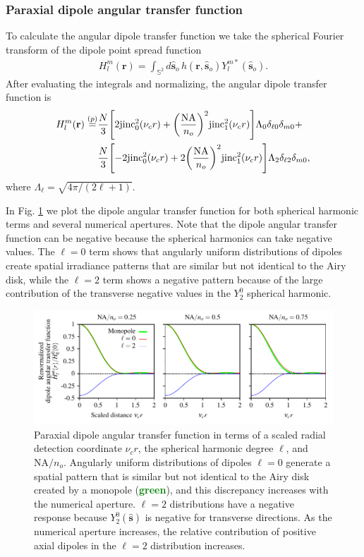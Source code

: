 \documentclass[]{osa-article}
\let\originalleft\left
\let\originalright\right
\renewcommand{\left}{\mathopen{}\mathclose\bgroup\originalleft}
\renewcommand{\right}{\aftergroup\egroup\originalright}
\providecommand{\mb}[1]{\mathbf{#1}}
\providecommand{\so}{\mathbf{\hat{s}}_o}
\providecommand{\mh}[1]{\mathbf{\hat{#1}}}
\providecommand{\mbb}[1]{\mathbb{#1}}
\begin{document}
 \subsubsection{Paraxial dipole angular transfer function}
 To calculate the angular dipole transfer function we take the spherical Fourier
 transform of the dipole point spread function
 \begin{align}
H_l^m(\mb{r}) \stackrel{}{=} \int_{\mbb{S}^2}d\so\, h(\mb{r}, \so)Y_l^{m*}(\so).
 \end{align}
 After evaluating the integrals and normalizing, the angular dipole transfer
 function is
 \begin{align}
   H_l^m(\mb{r}) \stackrel{(p)}{=} &\frac{N}{3}\left[2\text{jinc}_0^2(\nu_cr) + \left(\frac{\text{NA}}{n_o}\right)^2\text{jinc}_1^2(\nu_c r)\right]\Lambda_0\delta_{\ell0}\delta_{m0} + \nonumber\\& \frac{N}{3}\left[-2\text{jinc}_0^2(\nu_c r) + 2\left(\frac{\text{NA}}{n_o}\right)^2\text{jinc}_1^2(\nu_c r)\right]\Lambda_2\delta_{\ell2}\delta_{m0},
 \end{align}
where $\Lambda_{\ell} = \sqrt{4\pi/(2\ell + 1)}$. 

In Fig. \ref{fig:atf} we plot the dipole angular transfer function for both
spherical harmonic terms and several numerical apertures. Note that the dipole
angular transfer function can be negative because the spherical harmonics can
take negative values. The $\ell=0$ term shows that angularly uniform
distributions of dipoles create spatial irradiance patterns that are similar but
not identical to the Airy disk, while the $\ell=2$ term shows a negative pattern
because of the large contribution of the transverse negative values in the
$Y_2^0$ spherical harmonic.

\begin{figure}[ht]
 \centering
   \centering
   \includegraphics[scale=0.8]{../figures/paratfs/adtf.pdf}
   \caption{Paraxial dipole angular transfer function in terms of a scaled
     radial detection coordinate $\nu_c r$, the spherical harmonic degree
     $\ell$, and $\text{NA}/n_o$. Angularly uniform distributions of dipoles
     $\ell=0$ generate a spatial pattern that is similar but not identical to
     the Airy disk created by a monopole (\textcolor{green}{\textbf{green}}),
     and this discrepancy increases with the numerical aperture. $\ell=2$
     distributions have a negative response because $Y_2^0(\mh{s})$ is negative
     for transverse directions. As the numerical aperture increases, the
     relative contribution of positive axial dipoles in the $\ell=2$
     distribution increases.}
   \label{fig:atf}
 \end{figure}
\end{document}
